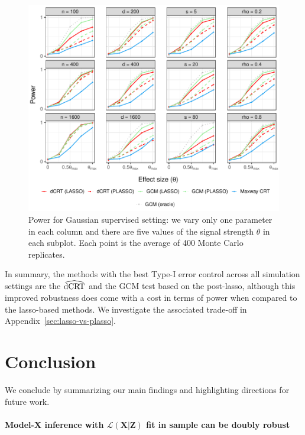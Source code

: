 \documentclass[aos]{imsart}
\theoremstyle{plain}
\theoremstyle{remark}
\newcommand{\prx}{\bm X}								%
\newcommand{\prz}{\bm Z}								%
\newcommand{\law}{\mathcal L}							%
\newcommand{\dCRThat}{\widehat{\textnormal{dCRT}}}		%
\begin{document}
\begin{figure}[h]
    \centering
    \includegraphics[width = \textwidth]{figures/gaussian_supervised_setting_alternative_partial.pdf}
    \caption{Power for Gaussian supervised setting: we vary only one parameter in each column and there are five values of the signal strength $\theta$ in each subplot. Each point is the average of 400 Monte Carlo replicates.}
    \label{fig:gaussian_supervised_partial_alternative}
\end{figure}

In summary, the methods with the best Type-I error control across all simulation settings are the $\dCRThat$ and the GCM test based on the post-lasso, although this improved robustness does come with a cost in terms of power when compared to the lasso-based methods. We investigate the associated trade-off in Appendix~\ref{sec:lasso-vs-plasso}.

\section{Conclusion} \label{sec:conclusion}

We conclude by summarizing our main findings and highlighting directions for future work.

\paragraph*{Model-X inference with $\law(\prx|\prz)$ fit in sample can be doubly robust}
\end{document}
